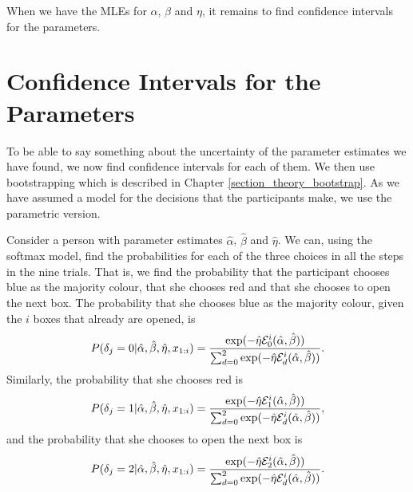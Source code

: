 When we have the MLEs for $\alpha$, $\beta$ and $\eta$, it remains to find confidence intervals for the parameters. 


\section{Confidence Intervals for the Parameters}
To be able to say something about the uncertainty of the parameter estimates we have found, we now find confidence intervals for each of them. We then use bootstrapping which is described in Chapter \ref{section_theory_bootstrap}. As we have assumed a model for the decisions that the participants make, we use the parametric version. 

Consider a person with parameter estimates $\hat{\alpha}$, $\hat{\beta}$ and $\hat{\eta}$. We can, using the softmax model, find the probabilities for each of the three choices in all the steps in the nine trials. That is, we find the probability that the participant chooses blue as the majority colour, that she chooses red and that she chooses to open the next box. The probability that she chooses blue as the majority colour, given the $i$ boxes that already are opened, is 
\begin{equation}
\label{prob_choose_blue}
    P(\delta_{j}=0|\hat{\alpha}, \hat{\beta},\hat{\eta},x_{1:i}) = \frac{\text{exp}(- \hat{\eta} \mathcal{E}^i_{0}(\hat{\alpha}, \hat{\beta}))}{\sum_{d=0}^{2} \text{exp}(-\hat{\eta} \mathcal{E}^i_{d}(\hat{\alpha}, \hat{\beta}))}. 
\end{equation}
Similarly, the probability that she chooses red is
\begin{equation}
\label{prob_choose_red}
    P(\delta_{j}=1|\hat{\alpha}, \hat{\beta},\hat{\eta},x_{1:i}) = \frac{\text{exp}(- \hat{\eta} \mathcal{E}^i_{1}(\hat{\alpha}, \hat{\beta}))}{\sum_{d=0}^{2} \text{exp}(-\hat{\eta} \mathcal{E}^i_{d}(\hat{\alpha}, \hat{\beta}))}, 
\end{equation}
and the probability that she chooses to open the next box is
\begin{equation}
\label{prob_choose_open_next}
    P(\delta_{j}=2|\hat{\alpha}, \hat{\beta},\hat{\eta},x_{1:i}) = \frac{\text{exp}(- \hat{\eta} \mathcal{E}^i_{2}(\hat{\alpha}, \hat{\beta}))}{\sum_{d=0}^{2} \text{exp}(-\hat{\eta} \mathcal{E}^i_{d}(\hat{\alpha}, \hat{\beta}))}. 
\end{equation}
